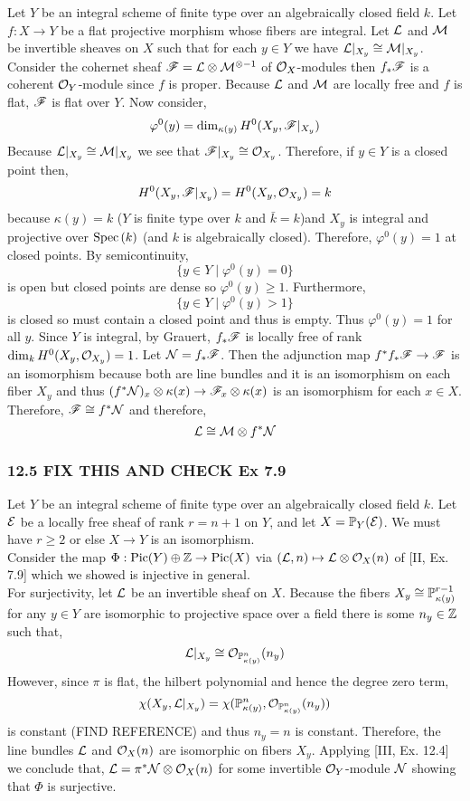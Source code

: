 \documentclass[12pt]{article}
\begin{document}
Let $Y$ be an integral scheme of finite type over an algebraically closed field $k$. Let $f : X \to Y$ be a flat projective morphism whose fibers are integral. Let $\L$ and $\M$ be invertible sheaves on $X$ such that for each $y \in Y$ we have $\L|_{X_y} \cong \M|_{X_y}$. 
\bigskip\\
Consider the cohernet sheaf $\F = \L \otimes \M^{\otimes -1}$ of $\struct{X}$-modules then $f_* \F$ is a coherent $\struct{Y}$-module since $f$ is proper. Because $\L$ and $\M$ are locally free and $f$ is flat, $\F$ is flat over $Y$. Now consider,
\[ \varphi^0(y) = \dim_{\kappa(y)} H^0(X_y, \F|_{X_y}) \]
Because $\L|_{X_y} \cong \M|_{X_y}$ we see that $\F|_{X_y} \cong \struct{X_y}$. 
Therefore, if $y \in Y$ is a closed point then,
\[ H^0(X_y, \F|_{X_y}) = H^0(X_y, \struct{X_y}) = k \] because $\kappa(y) = k$ ($Y$ is finite type over $k$ and $\bar{k} = k$)and $X_y$ is integral and projective over $\Spec{k}$ (and $k$ is algebraically closed). Therefore, $\varphi^0(y) = 1$ at closed points. By semicontinuity, 
\[ \{ y \in Y \mid \varphi^0(y) = 0 \} \]
is open but closed points are dense so $\varphi^0(y) \ge 1$. Furthermore, 
\[ \{ y \in Y \mid \varphi^0(y) > 1 \} \]
is closed so must contain a closed point and thus is empty. Thus $\varphi^0(y) = 1$ for all $y$. Since $Y$ is integral, by Grauert, $f_* \F$ is locally free of rank $\dim_k H^0(X_y, \struct{X_y}) = 1$. Let $\sN = f_* \F$. Then the adjunction map $f^* f_* \F \to \F$ is an isomorphism because both  are line bundles and it is an isomorphism on each fiber $X_y$ and thus $(f^* \sN)_x \ot \kappa(x) \to \F_x \ot \kappa(x)$ is an isomorphism for each $x \in X$. Therefore, $\F \cong f^* \sN$ and therefore,
\[ \L \cong \M \otimes f^* \sN \]

\subsubsection{12.5 FIX THIS AND CHECK Ex 7.9}

Let $Y$ be an integral scheme of finite type over an algebraically closed field $k$. Let $\E$ be a locally free sheaf of rank $r = n + 1$ on $Y$, and let $X = \P_Y(\E)$. We must have $r \ge 2$ or else $X \to Y$ is an isomorphism.
\bigskip\\
Consider the map $\Phi : \Pic{Y} \oplus \Z \to \Pic{X}$ via $(\L, n) \mapsto \L \otimes \struct{X}(n)$ of [II, Ex. 7.9] which we showed is injective in general. 
\bigskip\\
For surjectivity, let $\L$ be an invertible sheaf on $X$. Because the fibers $X_y \cong \P^{r-1}_{\kappa(y)}$ for any $y \in Y$ are isomorphic to projective space over a field there is some $n_y \in \Z$ such that,
 \[ \L|_{X_y} \cong \struct{\P^{n}_{\kappa(y)}}(n_y) \]
However, since $\pi$ is flat, the hilbert polynomial and hence the degree zero term, 
\[ \chi(X_y, \L|_{X_y}) = \chi(\P^{n}_{\kappa(y)}, \struct{\P^{n}_{\kappa(y)}}(n_y)) \]
is constant (FIND REFERENCE) and thus $n_y = n$ is constant. Therefore, the line bundles $\L$ and $\struct{X}(n)$ are isomorphic on fibers $X_y$. Applying [III, Ex. 12.4] we conclude that, $\L = \pi^* \sN \otimes \struct{X}(n)$ for some invertible $\struct{Y}$-module $\sN$ showing that $\Phi$ is surjective.
\end{document}
